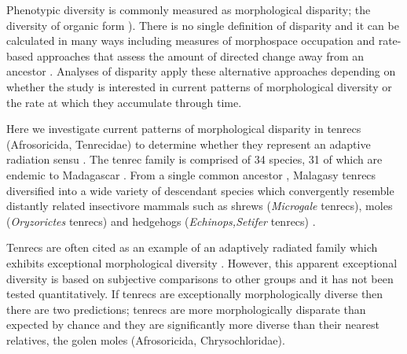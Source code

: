 \documentclass[12pt,a4paper]{article}
\begin{document}
Phenotypic diversity is commonly measured as morphological disparity; the diversity of organic form \citep{Foote1997,Erwin2007}). There is no single definition of disparity and it can be calculated in many ways including measures of morphospace occupation \citep[e.g.][]{Goswami2011, Brusatte2008} and rate-based approaches that assess the amount of directed change away from an ancestor \citep{OMeara2006, Price2013}. Analyses of disparity apply these alternative approaches depending on whether the study is interested in current patterns of morphological diversity or the rate at which they accumulate through time. 




Here we investigate current patterns of morphological disparity in tenrecs (Afrosoricida, Tenrecidae) to determine whether they represent an adaptive radiation sensu \citep{Losos2010a}. The tenrec family is comprised of 34 species, 31 of which are endemic to Madagascar \citep{Olson2013}. From a single common ancestor \citep{Asher2006}, Malagasy tenrecs diversified into a wide variety of descendant species which convergently resemble distantly related insectivore mammals such as shrews (\textit{Microgale} tenrecs), moles (\textit{Oryzorictes} tenrecs) and hedgehogs (\textit{Echinops,Setifer} tenrecs) \citep{Eisenberg1969}.

Tenrecs are often cited as an example of an adaptively radiated family which exhibits exceptional morphological diversity \citep{Soarimalala2011, Olson2003, Eisenberg1969}. However, this apparent exceptional diversity is based on subjective comparisons to other groups and it has not been tested quantitatively. If tenrecs are exceptionally morphologically diverse then there are two predictions; tenrecs are more morphologically disparate than expected by chance and they are significantly more diverse than their nearest relatives, the golen moles (Afrosoricida, Chrysochloridae).


\end{document}
